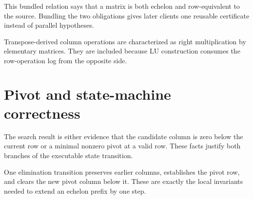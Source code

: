 \begin{definition}
\label{def:echelon-representative}
\leanok
{}
This bundled relation says that a matrix is both echelon and row-equivalent to the source.
Bundling the two obligations gives later clients one reusable certificate instead of parallel
hypotheses.
\end{definition}

\begin{theorem}
\label{thm:column-operation-semantics}
\leanok
{}
Transpose-derived column operations are characterized as right multiplication by elementary
matrices.  They are included because LU construction consumes the row-operation log from the
opposite side.
\end{theorem}

\chapter{Pivot and state-machine correctness}

\begin{theorem}
\label{thm:pivot-search}
\leanok
{}
The search result is either evidence that the candidate column is zero below the current row or
a minimal nonzero pivot at a valid row.  These facts justify both branches of the executable
state transition.
\end{theorem}

\begin{theorem}
\label{thm:column-elimination-invariants}
\leanok
{}
One elimination transition preserves earlier columns, establishes the pivot row, and clears the
new pivot column below it.  These are exactly the local invariants needed to extend an echelon
prefix by one step.
\end{theorem}

